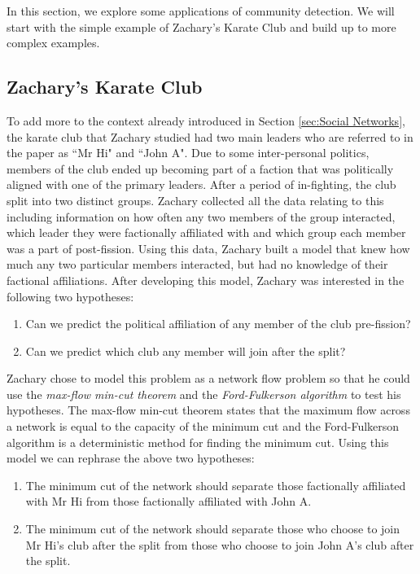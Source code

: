 In this section, we explore some applications of community detection. We will start with the simple example of Zachary's Karate Club and build up to more complex examples.

\subsection{Zachary's Karate Club}\label{sec:zachary_section}
To add more to the context already introduced in Section \ref{sec:Social Networks}, the karate club that Zachary studied had two main leaders who are referred to in the paper as ``Mr Hi" and ``John A". Due to some inter-personal politics, members of the club ended up becoming part of a faction that was politically aligned with one of the primary leaders. After a period of in-fighting, the club split into two distinct groups. Zachary collected all the data relating to this including information on how often any two members of the group interacted, which leader they were factionally affiliated with and which group each member was a part of post-fission. Using this data, Zachary built a model that knew how much any two particular members interacted, but had no knowledge of their factional affiliations. After developing this model, Zachary was interested in the following two hypotheses:

\begin{enumerate}
    \item Can we predict the political affiliation of any member of the club pre-fission?
    \item Can we predict which club any member will join after the split?
\end{enumerate}

Zachary chose to model this problem as a network flow problem so that he could use the \emph{max-flow min-cut theorem} and the \emph{Ford-Fulkerson algorithm}\cite{ford_fulkerson_1956} to test his hypotheses. The max-flow min-cut theorem states that the maximum flow across a network is equal to the capacity of the minimum cut and the Ford-Fulkerson algorithm is a deterministic method for finding the minimum cut. Using this model we can rephrase the above two hypotheses:

\begin{enumerate}
    \item The minimum cut of the network should separate those factionally affiliated with Mr Hi from those factionally affiliated with John A.
    \item The minimum cut of the network should separate those who choose to join Mr Hi's club after the split from those who choose to join John A's club after the split.
\end{enumerate}

